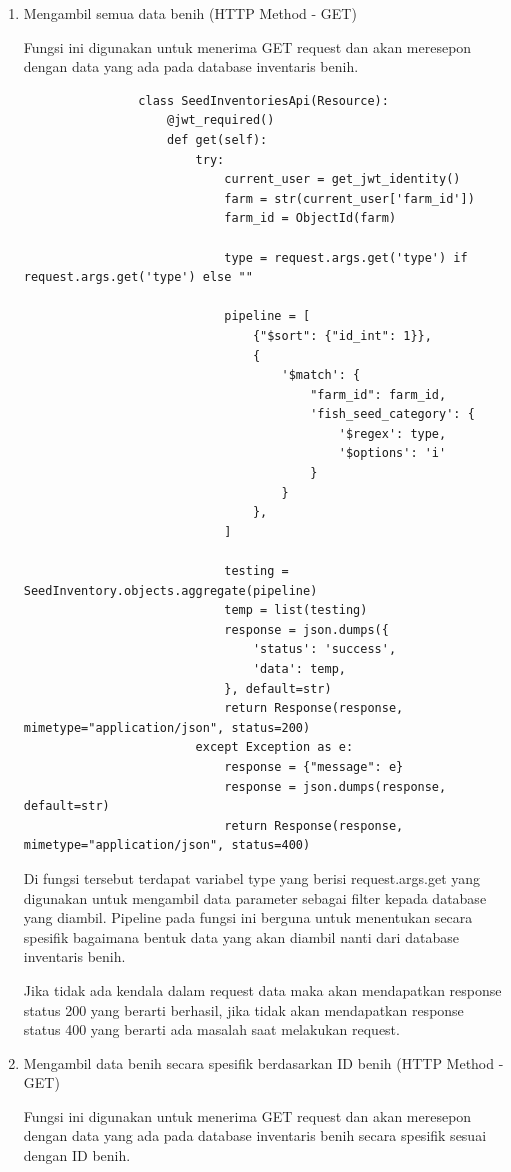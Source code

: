 \begin{spacing}{1.5}
\begin{enumerate}
		\begin{enumerate}
			\item Mengambil semua data benih (HTTP Method - GET)
			
			Fungsi ini digunakan untuk menerima GET request dan akan meresepon dengan data yang ada pada database inventaris benih.
			
			\begin{lstlisting}
				class SeedInventoriesApi(Resource):
					@jwt_required()
					def get(self):
						try:
							current_user = get_jwt_identity()
							farm = str(current_user['farm_id'])
							farm_id = ObjectId(farm)
							
							type = request.args.get('type') if request.args.get('type') else ""
				
							pipeline = [
								{"$sort": {"id_int": 1}},
								{
									'$match': {
										"farm_id": farm_id,
										'fish_seed_category': {
											'$regex': type,
											'$options': 'i'
										}
									}
								},
							]
						
							testing = SeedInventory.objects.aggregate(pipeline)
							temp = list(testing)
							response = json.dumps({
								'status': 'success',
								'data': temp,
							}, default=str)
							return Response(response, mimetype="application/json", status=200)
						except Exception as e:
							response = {"message": e}
							response = json.dumps(response, default=str)
							return Response(response, mimetype="application/json", status=400)
			\end{lstlisting}

			Di fungsi tersebut terdapat variabel type yang berisi request.args.get yang digunakan untuk mengambil data parameter sebagai filter kepada database yang diambil. Pipeline pada fungsi ini berguna untuk menentukan secara spesifik bagaimana bentuk data yang akan diambil nanti dari database inventaris benih. 
			
			Jika tidak ada kendala dalam request data maka akan mendapatkan response status 200 yang berarti berhasil, jika tidak akan mendapatkan response status 400 yang berarti ada masalah saat melakukan request.

			\hfill \break
			
			\item Mengambil data benih secara spesifik berdasarkan ID benih (HTTP Method - GET)
			
			Fungsi ini digunakan untuk menerima GET request dan akan meresepon dengan data yang ada pada database inventaris benih secara spesifik sesuai dengan ID benih.
			

\end{enumerate}
\end{enumerate}
\end{spacing}
